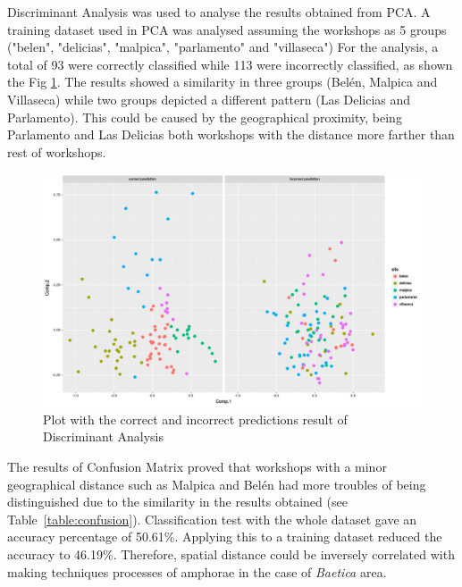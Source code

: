 \documentclass[review]{elsarticle}
\begin{document}
Discriminant Analysis was used to analyse the results obtained from PCA.  A training dataset used in PCA was analysed assuming the workshops as 5 groups ("belen", "delicias", "malpica", "parlamento" and "villaseca") For the analysis, a total of 93 were correctly classified while 113 were incorrectly classified, as shown the Fig \ref{prediction}. The results showed a similarity in three groups (Bel\'en, Malpica and Villaseca) while two groups depicted a different pattern (Las Delicias and Parlamento). This could be caused by the geographical proximity, being Parlamento and Las Delicias both workshops with the distance more farther than rest of workshops. 

\begin{figure}[htp]
	\centering
\includegraphics[scale=0.35]{prediction.png}
\caption{Plot with the correct and incorrect predictions result of Discriminant Analysis}
\label{prediction}
\end{figure} 

The results of Confusion Matrix proved that workshops with a minor geographical distance such as Malpica and Bel\'en had more troubles of being distinguished due to the similarity in the results obtained (see Table~\ref{table:confusion}). Classification test with the whole dataset gave an accuracy percentage of 50.61\%. Applying this to a training dataset reduced the accuracy to 46.19\%. Therefore, spatial distance could be inversely correlated with making techniques processes of amphorae in the case of \textit{Baetica} area. 
\end{document}
